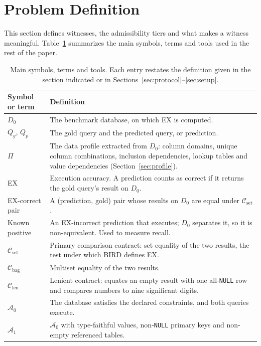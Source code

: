 \section{Problem Definition}\label{sec:problem}

This section defines witnesses, the admissibility tiers and what makes a witness meaningful. Table~\ref{tab:nomenclature} summarizes the main symbols, terms and tools used in the rest of the paper.

\begin{table}[!htbp]
\centering\scriptsize
\caption{Main symbols, terms and tools. Each entry restates the definition given in the section indicated or in Sections~\ref{sec:protocol}--\ref{sec:setup}.}\label{tab:nomenclature}
\begin{tabularx}{\linewidth}{@{}l>{\raggedright\arraybackslash}X@{}}
\toprule
Symbol or term & Definition\\
\midrule
$D_0$ & The benchmark database, on which EX is computed.\\
$Q_g$, $Q_p$ & The gold query and the predicted query, or prediction.\\
$\Pi$ & The data profile extracted from $D_0$: column domains, unique column combinations, inclusion dependencies, lookup tables and value dependencies (Section~\ref{sec:profile}).\\
EX & Execution accuracy. A prediction counts as correct if it returns the gold query's result on $D_0$.\\
EX-correct pair & A (prediction, gold) pair whose results on $D_0$ are equal under $\mathcal C_{\mathrm{set}}$.\\
Known positive & An EX-incorrect prediction that executes; $D_0$ separates it, so it is non-equivalent. Used to measure recall.\\
\midrule
$\mathcal C_{\mathrm{set}}$ & Primary comparison contract: set equality of the two results, the test under which BIRD defines EX.\\
$\mathcal C_{\mathrm{bag}}$ & Multiset equality of the two results.\\
$\mathcal C_{\mathrm{len}}$ & Lenient contract: equates an empty result with one all-\texttt{NULL} row and compares numbers to nine significant digits.\\
\midrule
$\mathcal A_0$ & The database satisfies the declared constraints, and both queries execute.\\
$\mathcal A_1$ & $\mathcal A_0$ with type-faithful values, non-\texttt{NULL} primary keys and non-empty referenced tables.\\

\end{tabularx}
\end{table}
